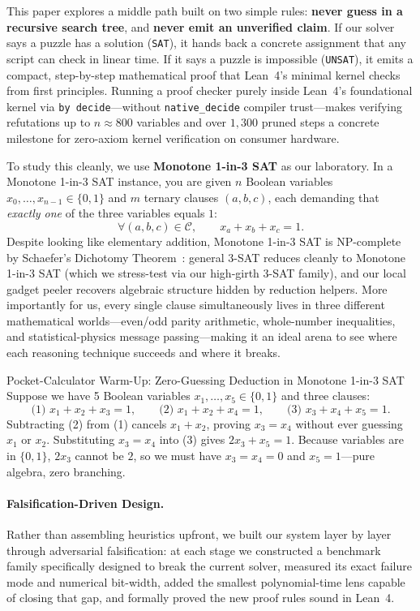\documentclass[11pt]{article}
\begin{document}
This paper explores a middle path built on two simple rules: \textbf{never guess in a recursive search tree}, and \textbf{never emit an unverified claim}. If our solver says a puzzle has a solution (\texttt{SAT}), it hands back a concrete assignment that any script can check in linear time. If it says a puzzle is impossible (\texttt{UNSAT}), it emits a compact, step-by-step mathematical proof that Lean~4's minimal kernel checks from first principles. Running a proof checker purely inside Lean~4's foundational kernel via \texttt{by decide}---without \texttt{native\_decide} compiler trust---makes verifying refutations up to $n \approx 800$ variables and over $1{,}300$ pruned steps a concrete milestone for zero-axiom kernel verification on consumer hardware.

To study this cleanly, we use \textbf{Monotone 1-in-3 SAT} as our laboratory. In a Monotone 1-in-3 SAT instance, you are given $n$ Boolean variables $x_0, \dots, x_{n-1} \in \{0, 1\}$ and $m$ ternary clauses $(a, b, c)$, each demanding that \emph{exactly one} of the three variables equals $1$:
\[
\forall (a, b, c) \in \mathcal{C}, \qquad x_a + x_b + x_c = 1.
\]
Despite looking like elementary addition, Monotone 1-in-3 SAT is NP-complete by Schaefer's Dichotomy Theorem~\cite{schaefer1978}: general 3-SAT reduces cleanly to Monotone 1-in-3 SAT (which we stress-test via our high-girth 3-SAT family), and our local gadget peeler recovers algebraic structure hidden by reduction helpers. More importantly for us, every single clause simultaneously lives in three different mathematical worlds---even/odd parity arithmetic, whole-number inequalities, and statistical-physics message passing---making it an ideal arena to see where each reasoning technique succeeds and where it breaks.

\begin{intuition}{Pocket-Calculator Warm-Up: Zero-Guessing Deduction in Monotone 1-in-3 SAT}
Suppose we have 5 Boolean variables $x_1, \dots, x_5 \in \{0, 1\}$ and three clauses:
\[
\text{(1) } x_1 + x_2 + x_3 = 1, \qquad
\text{(2) } x_1 + x_2 + x_4 = 1, \qquad
\text{(3) } x_3 + x_4 + x_5 = 1.
\]
Subtracting (2) from (1) cancels $x_1 + x_2$, proving $x_3 = x_4$ without ever guessing $x_1$ or $x_2$. Substituting $x_3 = x_4$ into (3) gives $2x_3 + x_5 = 1$. Because variables are in $\{0, 1\}$, $2x_3$ cannot be $2$, so we must have $x_3 = x_4 = 0$ and $x_5 = 1$---pure algebra, zero branching.
\end{intuition}

\paragraph{Falsification-Driven Design.} Rather than assembling heuristics upfront, we built our system layer by layer through adversarial falsification: at each stage we constructed a benchmark family specifically designed to break the current solver, measured its exact failure mode and numerical bit-width, added the smallest polynomial-time lens capable of closing that gap, and formally proved the new proof rules sound in Lean~4.
\end{document}
